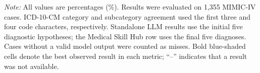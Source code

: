 \documentclass[10pt,letterpaper]{article}
\begin{document}
\begin{table}[h]
  \vspace{0.35em}
  \begin{minipage}{0.98\textwidth}
    \footnotesize
    \textit{Note:} All values are percentages (\%). Results were evaluated on
    1,355 MIMIC-IV cases. ICD-10-CM category and subcategory agreement used the
    first three and four code characters, respectively. Standalone LLM results
    use the initial five diagnostic hypotheses; the Medical Skill Hub row uses
    the final five diagnoses. Cases without a valid model output were counted as
    misses. Bold blue-shaded cells denote the best observed result in each
    metric; ``--'' indicates that a result was not available.
  \end{minipage}
\end{table}
\end{document}
